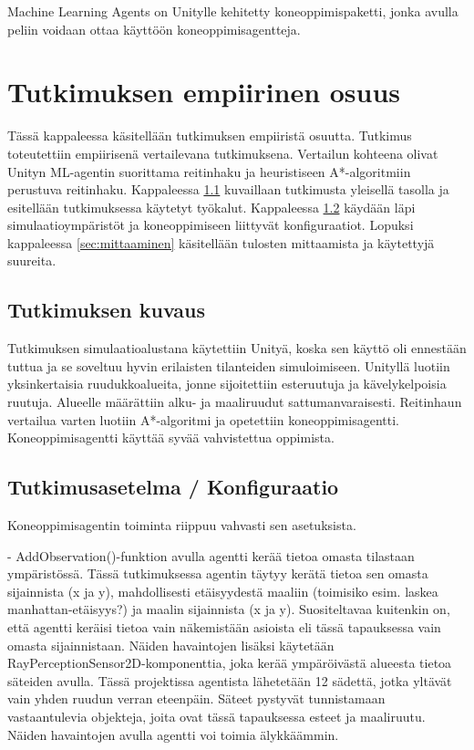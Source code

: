 \documentclass[utf8]{gradu3}
\begin{document}
Machine Learning Agents on Unitylle kehitetty koneoppimispaketti, jonka avulla peliin voidaan ottaa käyttöön koneoppimisagentteja.

\chapter{Tutkimuksen empiirinen osuus}

Tässä kappaleessa käsitellään tutkimuksen empiiristä osuutta. Tutkimus toteutettiin empiirisenä vertailevana tutkimuksena. Vertailun kohteena olivat Unityn ML-agentin suorittama reitinhaku ja heuristiseen A*-algoritmiin perustuva reitinhaku. Kappaleessa \ref{sec:tutkimuksenkuvaus} kuvaillaan tutkimusta yleisellä tasolla ja esitellään tutkimuksessa käytetyt työkalut. Kappaleessa \ref{sec:tutkimusasetelma} käydään läpi simulaatioympäristöt ja koneoppimiseen liittyvät konfiguraatiot. Lopuksi kappaleessa \ref{sec:mittaaminen} käsitellään tulosten mittaamista ja käytettyjä suureita.

\section{Tutkimuksen kuvaus}
\label{sec:tutkimuksenkuvaus}

Tutkimuksen simulaatioalustana käytettiin Unityä, koska sen käyttö oli ennestään tuttua ja se soveltuu hyvin erilaisten tilanteiden simuloimiseen. Unityllä luotiin yksinkertaisia ruudukkoalueita, jonne sijoitettiin esteruutuja ja kävelykelpoisia ruutuja. Alueelle määrättiin alku- ja maaliruudut sattumanvaraisesti. Reitinhaun vertailua varten luotiin A*-algoritmi ja opetettiin koneoppimisagentti. Koneoppimisagentti käyttää syvää vahvistettua oppimista.

\section{Tutkimusasetelma / Konfiguraatio}
\label{sec:tutkimusasetelma}

Koneoppimisagentin toiminta riippuu vahvasti sen asetuksista.

- AddObservation()-funktion avulla agentti kerää tietoa omasta tilastaan ympäristössä. Tässä tutkimuksessa agentin täytyy kerätä tietoa sen omasta sijainnista (x ja y), mahdollisesti etäisyydestä maaliin (toimisiko esim. laskea manhattan-etäisyys?) ja maalin sijainnista (x ja y). Suositeltavaa kuitenkin on, että agentti keräisi tietoa vain näkemistään asioista eli tässä tapauksessa vain omasta sijainnistaan. Näiden havaintojen lisäksi käytetään RayPerceptionSensor2D-komponenttia, joka kerää ympäröivästä alueesta tietoa säteiden avulla. Tässä projektissa agentista lähetetään 12 sädettä, jotka yltävät vain yhden ruudun verran eteenpäin. Säteet pystyvät tunnistamaan vastaantulevia objekteja, joita ovat tässä tapauksessa esteet ja maaliruutu. Näiden havaintojen avulla agentti voi toimia älykkäämmin.
\end{document}
